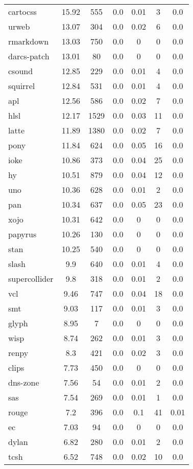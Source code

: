 \begin{longtable}{l|ccc|ccc}
cartocss & 15.92 & 555 & 0.0 & 0.01 & 3 & 0.0 \\
urweb & 13.07 & 304 & 0.0 & 0.02 & 6 & 0.0 \\
rmarkdown & 13.03 & 750 & 0.0 & 0 & 0 & 0.0 \\
darcs-patch & 13.01 & 80 & 0.0 & 0 & 0 & 0.0 \\
csound & 12.85 & 229 & 0.0 & 0.01 & 4 & 0.0 \\
squirrel & 12.84 & 531 & 0.0 & 0.01 & 4 & 0.0 \\
apl & 12.56 & 586 & 0.0 & 0.02 & 7 & 0.0 \\
hlsl & 12.17 & 1529 & 0.0 & 0.03 & 11 & 0.0 \\
latte & 11.89 & 1380 & 0.0 & 0.02 & 7 & 0.0 \\
pony & 11.84 & 624 & 0.0 & 0.05 & 16 & 0.0 \\
ioke & 10.86 & 373 & 0.0 & 0.04 & 25 & 0.0 \\
hy & 10.51 & 879 & 0.0 & 0.04 & 12 & 0.0 \\
uno & 10.36 & 628 & 0.0 & 0.01 & 2 & 0.0 \\
pan & 10.34 & 637 & 0.0 & 0.05 & 23 & 0.0 \\
xojo & 10.31 & 642 & 0.0 & 0 & 0 & 0.0 \\
papyrus & 10.26 & 130 & 0.0 & 0 & 0 & 0.0 \\
stan & 10.25 & 540 & 0.0 & 0 & 0 & 0.0 \\
slash & 9.9 & 640 & 0.0 & 0.01 & 4 & 0.0 \\
supercollider & 9.8 & 318 & 0.0 & 0.01 & 2 & 0.0 \\
vcl & 9.46 & 747 & 0.0 & 0.04 & 18 & 0.0 \\
smt & 9.03 & 117 & 0.0 & 0.01 & 3 & 0.0 \\
glyph & 8.95 & 7 & 0.0 & 0 & 0 & 0.0 \\
wisp & 8.74 & 262 & 0.0 & 0.01 & 3 & 0.0 \\
renpy & 8.3 & 421 & 0.0 & 0.02 & 3 & 0.0 \\
clips & 7.73 & 450 & 0.0 & 0 & 0 & 0.0 \\
dns-zone & 7.56 & 54 & 0.0 & 0.01 & 2 & 0.0 \\
sas & 7.54 & 269 & 0.0 & 0.01 & 1 & 0.0 \\
rouge & 7.2 & 396 & 0.0 & 0.1 & 41 & 0.01 \\
ec & 7.03 & 94 & 0.0 & 0 & 0 & 0.0 \\
dylan & 6.82 & 280 & 0.0 & 0.01 & 2 & 0.0 \\
tcsh & 6.52 & 748 & 0.0 & 0.02 & 10 & 0.0 \\

\end{longtable}
